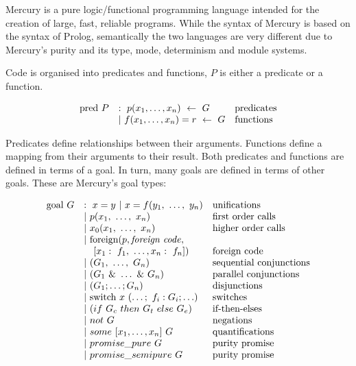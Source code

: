 
Mercury is a pure logic/functional programming language
intended for the creation of large, fast, reliable programs.
While the syntax of Mercury is based on the syntax of Prolog,
semantically the two languages are very different
due to Mercury's purity and its type, mode, determinism and module systems.

Code is organised into predicates and functions,
$P$ is either a predicate or a function.

$$
\begin{array}{lll}
\mbox{pred}~P
    & :~ p(x_1, \ldots, x_n)~\leftarrow~G
        & \hbox{predicates} \\
    & |~ f(x_1, \ldots, x_n)=r~\leftarrow~G
        & \hbox{functions} \\
\end{array}
$$

\noindent
Predicates define relationships between their arguments.
Functions define a mapping from their arguments to their result.
Both predicates and functions are defined in terms of a goal.
In turn, many goals are defined in terms of other goals.
These are Mercury's goal types:

$$
\begin{array}{lll}
\mbox{goal}~G
    & :~ x = y ~|~ x = f(y_1,~\ldots,~y_n)
        & \hbox{unifications}\\
    & |~ p(x_1,~\ldots,~x_n)
        & \hbox{first order calls} \\
    & |~ x_0(x_1,~\ldots,~x_n)
        & \hbox{higher order calls} \\
    & |~ \hbox{foreign}(p, \hbox{\emph{foreign code}},
        & \\
    & ~~~ [x_1:~f_1,~\ldots,x_n:~f_n])
        & \hbox{foreign code} \\
    & |~ (G_1,~\ldots,~G_n)
        & \hbox{sequential conjunctions}\\
    & |~ (G_1~\&~\ldots~\&~G_n)
        & \hbox{parallel conjunctions}\\
    & |~ (G_1 ; \ldots ; G_n)
        & \hbox{disjunctions}\\
    & |~ \hbox{switch}~x~(\ldots;~f_i: G_i ; \ldots)
        & \hbox{switches}\\
    & |~ (if~G_c~then~G_t~else~G_e)
        & \hbox{if-then-elses}\\
    & |~ not~G
        & \hbox{negations}\\
    & |~ some~[x_1,\ldots,x_n]~G
        & \hbox{quantifications}\\
    & |~ promise\_pure~G
        & \hbox{purity promise}\\
    & |~ promise\_semipure~G
        & \hbox{purity promise}\\
\end{array}
$$

